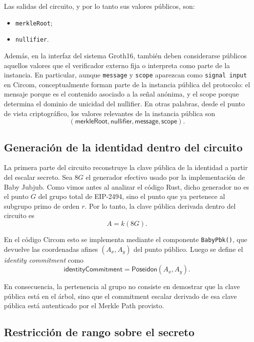 \documentclass[11pt,a4paper]{article}
\begin{document}
	Las salidas del circuito, y por lo tanto sus valores públicos, son:
	\begin{itemize}
		\item \texttt{merkleRoot};
		\item \texttt{nullifier}.
	\end{itemize}
	
	Además, en la interfaz del sistema Groth16, también deben considerarse públicos aquellos valores que el verificador externo fija o interpreta como parte de la instancia. En particular, aunque \texttt{message} y \texttt{scope} aparezcan como \texttt{signal input} en Circom, conceptualmente forman parte de la instancia pública del protocolo: el mensaje porque es el contenido asociado a la señal anónima, y el scope porque determina el dominio de unicidad del nullifier. En otras palabras, desde el punto de vista criptográfico, los valores relevantes de la instancia pública son
	\[
	(\mathsf{merkleRoot},\mathsf{nullifier},\mathsf{message},\mathsf{scope}).
	\]
	
	\subsection{Generación de la identidad dentro del circuito}
	
	La primera parte del circuito reconstruye la clave pública de la identidad a partir del escalar secreto. Sea \(8G\) el generador efectivo usado por la implementación de Baby Jubjub. Como vimos antes al analizar el código Rust, dicho generador no es el punto \(G\) del grupo total de EIP-2494, sino el punto que ya pertenece al subgrupo primo de orden \(r\). Por lo tanto, la clave pública derivada dentro del circuito es
	\[
	A = k(8G).
	\]
	
	En el código Circom esto se implementa mediante el componente \texttt{BabyPbk()}, que devuelve las coordenadas afines \((A_x,A_y)\) del punto público. Luego se define el \emph{identity commitment} como
	\[
	\mathsf{identityCommitment} = \mathsf{Poseidon}(A_x,A_y).
	\]
	
	En consecuencia, la pertenencia al grupo no consiste en demostrar que la clave pública está en el árbol, sino que el commitment escalar derivado de esa clave pública está autenticado por el Merkle Path provisto.
	
	\subsection{Restricción de rango sobre el secreto}
	
\end{document}
